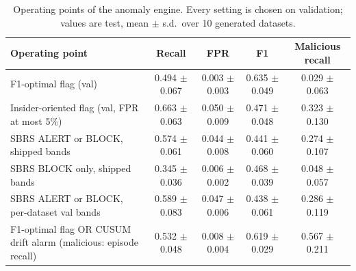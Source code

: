 \begin{table}[t]
\centering
\scriptsize
\caption{Operating points of the anomaly engine. Every setting is chosen on validation; values are test, mean $\pm$ s.d.\ over 10 generated datasets.}
\label{tab:oppoints}
\begin{tabular}{lcccc}
\hline
Operating point & Recall & FPR & F1 & Malicious recall \\
\hline
F1-optimal flag (val) & 0.494 $\pm$ 0.067 & 0.003 $\pm$ 0.003 & 0.635 $\pm$ 0.049 & 0.029 $\pm$ 0.063 \\
Insider-oriented flag (val, FPR at most 5\%) & 0.663 $\pm$ 0.063 & 0.050 $\pm$ 0.009 & 0.471 $\pm$ 0.048 & 0.323 $\pm$ 0.130 \\
SBRS ALERT or BLOCK, shipped bands & 0.574 $\pm$ 0.061 & 0.044 $\pm$ 0.008 & 0.441 $\pm$ 0.060 & 0.274 $\pm$ 0.107 \\
SBRS BLOCK only, shipped bands & 0.345 $\pm$ 0.036 & 0.006 $\pm$ 0.002 & 0.468 $\pm$ 0.039 & 0.048 $\pm$ 0.057 \\
SBRS ALERT or BLOCK, per-dataset val bands & 0.589 $\pm$ 0.083 & 0.047 $\pm$ 0.006 & 0.438 $\pm$ 0.061 & 0.286 $\pm$ 0.119 \\
F1-optimal flag OR CUSUM drift alarm (malicious: episode recall) & 0.532 $\pm$ 0.048 & 0.008 $\pm$ 0.004 & 0.619 $\pm$ 0.029 & 0.567 $\pm$ 0.211 \\
\hline
\end{tabular}
\end{table}
